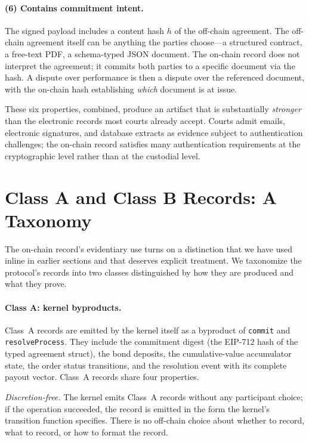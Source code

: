 \documentclass[11pt,a4paper]{article}
\theoremstyle{remark}
\begin{document}
\paragraph{(6) Contains commitment intent.}
The signed payload includes a content hash $h$ of the off-chain
agreement. The off-chain agreement itself can be anything the
parties choose---a structured contract, a free-text PDF, a
schema-typed JSON document. The on-chain record does not interpret
the agreement; it commits both parties to a specific document via
the hash. A dispute over performance is then a dispute over the
referenced document, with the on-chain hash establishing
\emph{which} document is at issue.

These six properties, combined, produce an artifact that is
substantially \emph{stronger} than the electronic records most
courts already accept. Courts admit emails, electronic signatures,
and database extracts as evidence subject to authentication
challenges; the on-chain record satisfies many authentication
requirements at the cryptographic level rather than at the
custodial level.

\section{Class A and Class B Records: A Taxonomy}
\label{sec:taxonomy}

The on-chain record's evidentiary use turns on a distinction that
we have used inline in earlier sections and that deserves explicit
treatment. We taxonomize the protocol's records into two classes
distinguished by how they are produced and what they prove.

\paragraph{Class A: kernel byproducts.}
Class~A records are emitted by the kernel itself as a byproduct of
\texttt{commit} and \texttt{resolveProcess}. They include the
commitment digest (the EIP-712 hash of the typed agreement
struct), the bond deposits, the cumulative-value accumulator
state, the order status transitions, and the resolution event
with its complete payout vector. Class~A records share four
properties.

\emph{Discretion-free.} The kernel emits Class~A records without
any participant choice; if the operation succeeded, the record is
emitted in the form the kernel's transition function specifies.
There is no off-chain choice about whether to record, what to
record, or how to format the record.
\end{document}

